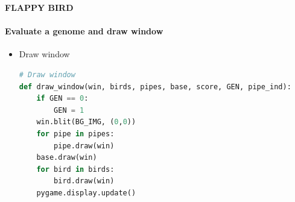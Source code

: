 \documentclass[10pt]{beamer}
\begin{document}
{
%
\begin{frame}[fragile]{\textbf{FLAPPY BIRD}}
    \framesubtitle{\textbf{Evaluate a genome and draw window}}
    \begin{itemize}
        \item Draw window \\
        \begin{lstlisting}[language=Python]
    # Draw window
def draw_window(win, birds, pipes, base, score, GEN, pipe_ind):
    if GEN == 0:
        GEN = 1
    win.blit(BG_IMG, (0,0))
    for pipe in pipes:
        pipe.draw(win)
    base.draw(win)
    for bird in birds:
        bird.draw(win)
    pygame.display.update()
        \end{lstlisting}
    \end{itemize}
\end{frame}
}
\end{document}
